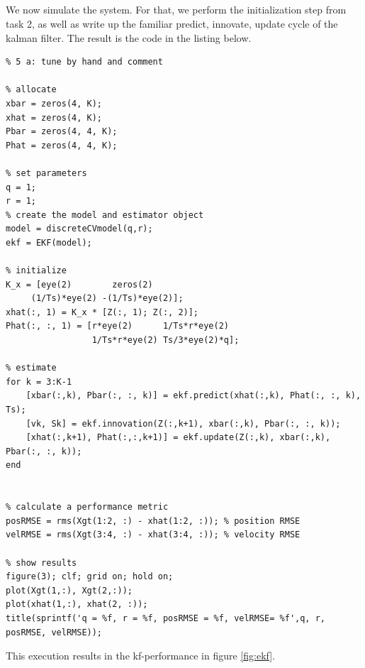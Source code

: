 \documentclass[]{article}
\begin{document}
\subsection{}
We now simulate the system. For that, we perform the initialization step from task 2, as well as write up the familiar predict, innovate, update cycle of the kalman filter. The result is the code in the listing below.
\begin{lstlisting}
% 5 a: tune by hand and comment

% allocate
xbar = zeros(4, K);
xhat = zeros(4, K);
Pbar = zeros(4, 4, K);
Phat = zeros(4, 4, K);

% set parameters
q = 1;
r = 1;
% create the model and estimator object
model = discreteCVmodel(q,r);
ekf = EKF(model);

% initialize
K_x = [eye(2)        zeros(2)
     (1/Ts)*eye(2) -(1/Ts)*eye(2)];
xhat(:, 1) = K_x * [Z(:, 1); Z(:, 2)];
Phat(:, :, 1) = [r*eye(2)      1/Ts*r*eye(2)
                 1/Ts*r*eye(2) Ts/3*eye(2)*q];

% estimate
for k = 3:K-1
    [xbar(:,k), Pbar(:, :, k)] = ekf.predict(xhat(:,k), Phat(:, :, k), Ts);
    [vk, Sk] = ekf.innovation(Z(:,k+1), xbar(:,k), Pbar(:, :, k));
    [xhat(:,k+1), Phat(:,:,k+1)] = ekf.update(Z(:,k), xbar(:,k), Pbar(:, :, k));
end


% calculate a performance metric
posRMSE = rms(Xgt(1:2, :) - xhat(1:2, :)); % position RMSE
velRMSE = rms(Xgt(3:4, :) - xhat(3:4, :)); % velocity RMSE

% show results
figure(3); clf; grid on; hold on;
plot(Xgt(1,:), Xgt(2,:));
plot(xhat(1,:), xhat(2, :));
title(sprintf('q = %f, r = %f, posRMSE = %f, velRMSE= %f',q, r, posRMSE, velRMSE));
\end{lstlisting}
This execution results in the kf-performance in figure \ref{fig:ekf}.
\end{document}
